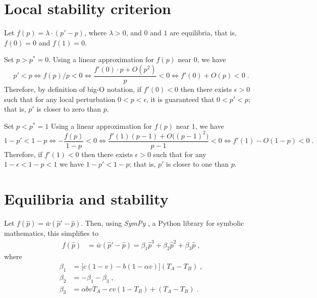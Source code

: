 \documentclass[12pt]{extarticle}
\begin{document}
\begin{appendices}
\renewcommand{\theequation}{\thesection\arabic{equation}}


\section{Local stability criterion} \label{sec:appendixA}


Let $f(p)=\lambda \cdot (p'-p)$, where $\lambda>0$, and $0$ and $1$ are equilibria, that is, $f(0)=0$ and $f(1)=0$.

Set $p>p^*=0$.
Using a linear approximation for $f(p)$ near $0$, we have
\begin{equation}
p' < p \Leftrightarrow 
f(p)/p < 0 \Leftrightarrow 
\frac{f'(0) \cdot p + O(p^2)}{p} < 0 \Leftrightarrow 
f'(0) + O(p) < 0 \;.
\end{equation}
Therefore, by definition of big-O notation, if $f'(0)<0$ then there exists $\epsilon>0$ such that for any local perturbation $0<p<\epsilon$, it is guaranteed that $0<p'<p$; that is, $p'$ is closer to zero than $p$.

Set $p<p^*=1$
Using a linear approximation for $f(p)$ near $1$, we have
\begin{equation}
1-p' < 1-p  \Leftrightarrow 
-\frac{f(p)}{1-p} < 0 \Leftrightarrow 
\frac{f'(1)(p-1) + O\big((p-1)^2\big)}{p-1} < 0 \Leftrightarrow 
f'(1) - O(1-p) < 0 \;.
\end{equation}
Therefore, if $f'(1)<0$ then there exists $\epsilon>0$ such that for any $1-\epsilon<1-p<1$ we have $1-p'<1-p$; that is, $p'$ is closer to one than $p$.


\newpage
\section{Equilibria and stability} \label{sec:appendixB}

Let $f(\hat{p}) = \bar{w}(\hat{p}' - \hat{p})$.
Then, using \emph{SymPy} \citep{Meurer2017}, a Python library for symbolic mathematics, this simplifies to
\begin{equation} \label{eq:general_case_polynomial}
\begin{aligned}
  f(\hat{p}) &= \bar{w}(\hat{p}'-\hat{p}) =
  \beta_1 \hat{p}^3 + \beta_2 \hat{p}^2 + \beta_3 \hat{p} \;,
\end{aligned}
\end{equation}
where 
\begin{equation} \label{eq:polynomial_coefficients}
\begin{aligned}
  \beta_1 &= \big[c(1-v) - b (1-\alpha v)\big] (T_A-T_B) \;, \\
  \beta_2 &= -\beta_1 -\beta_3 \;, \\
  \beta_3 &= \alpha bvT_A - cv(1-T_B) + (T_A-T_B) \;.
\end{aligned}
\end{equation}


\end{appendices}
\end{document}
